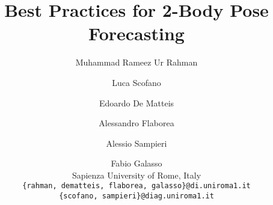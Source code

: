\documentclass[10pt,twocolumn,letterpaper]{article}
\begin{document}
\title{Best Practices for 2-Body Pose Forecasting}





\author{Muhammad Rameez Ur Rahman \and Luca Scofano \and Edoardo De Matteis \and Alessandro Flaborea \and Alessio Sampieri \and Fabio Galasso \\
Sapienza University of Rome, Italy \\
{\tt\small \{rahman, dematteis, flaborea, galasso\}@di.uniroma1.it} \\
{\tt\small \{scofano, sampieri\}@diag.uniroma1.it}
}

\maketitle
\begin{NoHyper}
    \def\thefootnote{*}
    \def\thefootnote{\arabic{footnote}}
\end{NoHyper}

\def\ckmk{\tikz\fill[scale=0.4](0,.35) -- (.25,0) -- (1,.7) -- (.25,.15) -- cycle;} 

\newcommand{\ls}[1]{\color{ForestGreen}#1}
\newcommand{\LS}[1]{{\color{ForestGreen}{\ls [Luca: #1]}}}

\newcommand{\ra}[1]{\color{BrickRed}#1}
\newcommand{\RA}[1]{{\color{BrickRed}{\ra [Rameez: #1]}}}

\newcommand{\ed}[1]{\color{Cerulean}#1}
\newcommand{\ED}[1]{{\color{Cerulean}{\ed [Edoardo: #1]}}}

\newcommand{\as}[1]{\color{blue}#1}
\newcommand{\AS}[1]{{\color{blue}{\as [Alessio: #1]}}}

\newcommand{\fg}[1]{\color{orange}#1}
\newcommand{\FG}[1]{{\color{orange}{\fg [Fabio: #1]}}}

\newcommand{\af}[1]{\color{purple}#1}
\newcommand{\AF}[1]{{\color{purple}{\af [AF: #1]}}}


\newcommand{\modelname}{IFS-GCN~}

\maketitle
\end{document}
